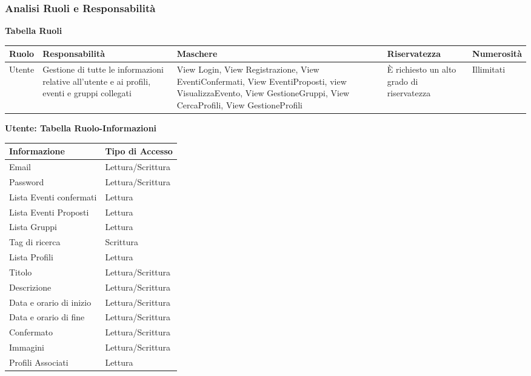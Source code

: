 \newpage

\subsubsection{Analisi Ruoli e Responsabilità}
\hfill \break

\textbf{Tabella Ruoli}
\hfill \break

\begin{tabular} {|P{2cm}|P{3cm}|P{4cm}|P{2.5cm}|P{2.5cm}|}
    \hline
    \textbf{Ruolo} & \textbf{Responsabilità}                                                                       & \textbf{Maschere}                                                                                                                                               & \textbf{Riservatezza}                     & \textbf{Numerosità} \\
    \hline
    Utente         & Gestione di tutte le informazioni relative all'utente e ai profili, eventi e gruppi collegati & View Login, View Registrazione, View EventiConfermati, View EventiProposti, view VisualizzaEvento, View GestioneGruppi, View CercaProfili, View GestioneProfili & È richiesto un alto grado di riservatezza & Illimitati          \\
    \hline
\end{tabular}
\hfill \break


\textbf{Utente: Tabella Ruolo-Informazioni}
\hfill \break

\begin{tabular} {|P{7.8cm}|P{7.5cm}|}
    \hline
    \textbf{Informazione}   & \textbf{Tipo di Accesso} \\
    \hline
    Email                   & Lettura/Scrittura        \\
    \hline
    Password                & Lettura/Scrittura        \\
    \hline
    Lista Eventi confermati & Lettura                  \\
    \hline
    Lista Eventi Proposti   & Lettura                  \\
    \hline
    Lista Gruppi            & Lettura                  \\
    \hline
    Tag di ricerca          & Scrittura                \\
    \hline
    Lista Profili           & Lettura                  \\
    \hline
    Titolo                  & Lettura/Scrittura        \\
    \hline
    Descrizione             & Lettura/Scrittura        \\
    \hline
    Data e orario di inizio & Lettura/Scrittura        \\
    \hline
    Data e orario di fine   & Lettura/Scrittura        \\
    \hline
    Confermato              & Lettura/Scrittura        \\
    \hline
    Immagini                & Lettura/Scrittura        \\
    \hline
    Profili Associati       & Lettura                  \\
    \hline
\end{tabular}
\newpage

